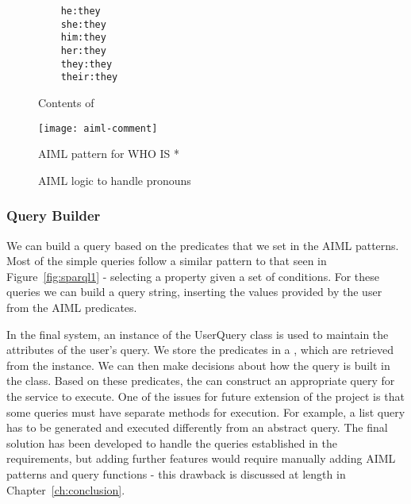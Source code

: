 \begin{figure}[h]
	\centering
	\begin{lstlisting}
	he:they
	she:they
	him:they
	her:they
	they:they
	their:they
	\end{lstlisting}
	\caption{Contents of }
	\label{fig:pronouns}
\end{figure}

\begin{figure}[pt]
	\centering
	\texttt{[image: aiml-comment]}
	\caption{AIML pattern for WHO IS *}
	\label{fig:aiml-comment}
	\qquad
	\caption{AIML logic to handle pronouns}
	\label{fig:aiml-pronouns}
\end{figure}

\newpage
\subsubsection{Query Builder}
We can build a query based on the predicates that we set in the AIML patterns. Most of the simple queries follow a similar pattern to that seen in Figure~\ref{fig:sparql1} - selecting a property given a set of conditions. For these queries we can build a query string, inserting the values provided by the user from the AIML predicates.

In the final system, an instance of the UserQuery class is used to maintain the attributes of the user's query. We store the predicates in a , which are retrieved from the  instance. We can then make decisions about how the query is built in the  class. Based on these predicates, the  can construct an appropriate query for the  service to execute. One of the issues for future extension of the project is that some queries must have separate methods for execution. For example, a list query has to be generated and executed differently from an abstract query. The final solution has been developed to handle the queries established in the requirements, but adding further features would require manually adding AIML patterns and query functions - this drawback is discussed at length in Chapter~\ref{ch:conclusion}.

